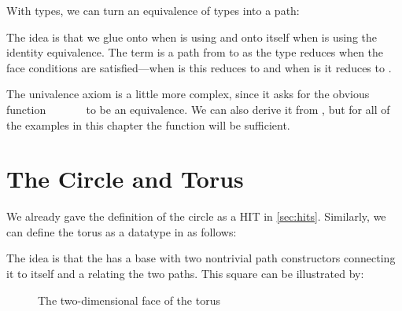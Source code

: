 With  types, we can turn an equivalence of types into a path:
%

The idea is that we glue  onto  when  is 
using  and  onto itself when  is  using
the identity equivalence. The term   is a path from
 to  as the  type reduces when the face
conditions are satisfied---when  is  this reduces to
 and when  is  it reduces to . %

The univalence axiom is a little more complex, since it asks for the obvious 
function ~~~\to~~~ to be an 
equivalence.
% 
We can also derive it from , but for all of the examples in this 
chapter the  function will be sufficient.


\section{The Circle and Torus}
\label{sec:torus}

We already gave the definition of the circle as a HIT in \cref{sec:hits}. 
Similarly, we can define the torus as a datatype in \CubicalAgda as follows:
%

The idea is that the  has a base  with two
nontrivial path constructors connecting it to itself and a
 relating the two paths. This square can be illustrated
by:
%
\begin{figure}[!h]
\caption{The two-dimensional face of the torus}
\end{figure}

